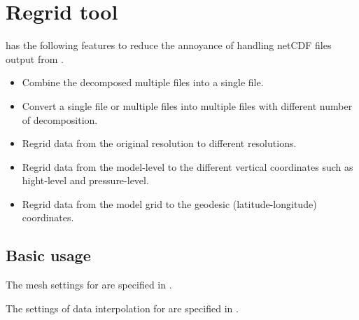 \section{Regrid tool} \label{sec:regrid_tool}

\regridTool has the following features to reduce the annoyance of handling netCDF files output from \scaledg.
\begin{itemize}
 \item Combine the decomposed multiple files into a single file.
 \item Convert a single file or multiple files into multiple files with different number of decomposition.
 \item Regrid data from the original resolution to different resolutions.
 \item Regrid data from the model-level to the different vertical coordinates such as hight-level and pressure-level.
 \item Regrid data from the model grid to the geodesic (latitude-longitude) coordinates.
\end{itemize}

\subsection{Basic usage}

The mesh settings for \regridTool are specified in .
%

The settings of data interpolation for \regridTool are specified in .
%


